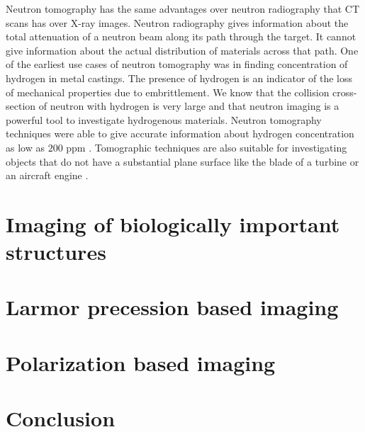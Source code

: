 \documentclass{article}
\numberwithin{equation}{section}
\begin{document}
Neutron tomography has the same advantages over neutron radiography that CT
scans has over X-ray images. Neutron radiography gives information about the
total attenuation of a neutron beam along its path through the target. It 
cannot give information about the actual distribution of materials across that
path. One of the earliest use cases of neutron tomography was in finding 
concentration of hydrogen in metal castings. The presence of hydrogen is an
indicator of the loss of mechanical properties due to embrittlement. We know
that the collision cross-section of neutron with hydrogen is very large and
that neutron imaging is a powerful tool to investigate hydrogenous materials. 
Neutron tomography techniques were able to give accurate information 
about hydrogen concentration as low as $200$ ppm \cite{richards2004neutron}.
Tomographic techniques are also suitable for investigating objects that do not
have a substantial plane surface like the blade of a turbine or an aircraft 
engine \cite{richards2004neutron}.

\section{Imaging of biologically important structures}\label{s10}
\section{Larmor precession based imaging}\label{s11}
\section{Polarization based imaging}\label{s12}
\section{Conclusion}\label{s13}


\end{document}
